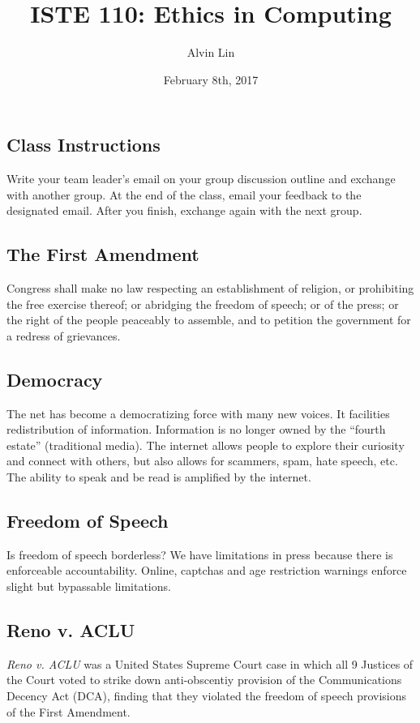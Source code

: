 \documentclass{article}
\title{ISTE 110: Ethics in Computing}
\author{Alvin Lin}
\date{February 8th, 2017}
\begin{document}
\maketitle

\subsection*{Class Instructions}
Write your team leader's email on your group discussion outline and exchange
with another group. At the end of the class, email your feedback to the
designated email. After you finish, exchange again with the next group.

\subsection*{The First Amendment}
Congress shall make no law respecting an establishment of religion, or
prohibiting the free exercise thereof; or abridging the freedom of speech; or
of the press; or the right of the people peaceably to assemble, and to petition
the government for a redress of grievances.

\subsection*{Democracy}
The net has become a democratizing force with many new voices. It facilities
redistribution of information. Information is no longer owned by the ``fourth
estate'' (traditional media). The internet allows people to explore their
curiosity and connect with others, but also allows for scammers, spam, hate
speech, etc. The ability to speak and be read is amplified by the internet.

\subsection*{Freedom of Speech}
Is freedom of speech borderless? We have limitations in press because there is
enforceable accountability. Online, captchas and age restriction warnings
enforce slight but bypassable limitations.

\subsection*{Reno v. ACLU}
\textit{Reno v. ACLU} was a United States Supreme Court case in which all 9
Justices of the Court voted to strike down anti-obscentiy provision of the
Communications Decency Act (DCA), finding that they violated the freedom of
speech provisions of the First Amendment.
\end{document}
